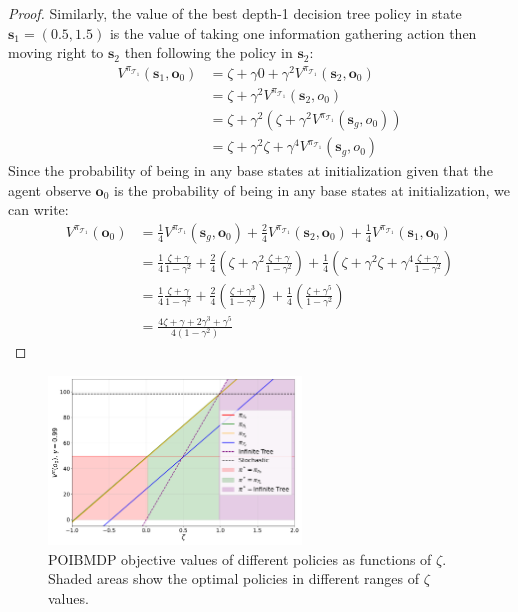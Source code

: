 \begin{proof}
Similarly, the value of the best depth-1 decision tree policy in state $\boldsymbol{s}_1=(0.5,1.5)$ is the value of taking one information gathering action then moving right to $\boldsymbol{s}_2$ then following the policy in $\boldsymbol{s}_2$:
\begin{align*}
    V^{\pi_{\mathcal{T}_1}} (\boldsymbol{s}_1, \boldsymbol{o}_0) &= \zeta + \gamma 0 + \gamma^2 V^{\pi_{\mathcal{T}_1}} (\boldsymbol{s}_2, \boldsymbol{o}_0) \\
    &= \zeta + \gamma^2 V^{\pi_{\mathcal{T}_1}} (\boldsymbol{s}_2, o_0) \\
    &= \zeta + \gamma^2 (\zeta + \gamma^2 V^{\pi_{\mathcal{T}_1}} (\boldsymbol{s}_g, o_0)) \\
    &= \zeta + \gamma^2 \zeta + \gamma^4 V^{\pi_{\mathcal{T}_1}} (\boldsymbol{s}_g, o_0)
\end{align*}
Since the probability of being in any base states at initialization given that the agent observe $\boldsymbol{o}_0$ is the probability of being in any base states at initialization, we can write:
\begin{align*}
    V^{\pi_{\mathcal{T}_1}} (\boldsymbol{o}_0) &= \frac{1}{4} V^{\pi_{\mathcal{T}_1}} (\boldsymbol{s}_g, \boldsymbol{o}_0) + \frac{2}{4} V^{\pi_{\mathcal{T}_1}} (\boldsymbol{s}_2, \boldsymbol{o}_0) + \frac{1}{4} V^{\pi_{\mathcal{T}_1}} (\boldsymbol{s}_1, \boldsymbol{o}_0) \\
    &= \frac{1}{4} \frac{\zeta + \gamma}{1 - \gamma^2} + \frac{2}{4} (\zeta + \gamma^2 \frac{\zeta + \gamma}{1 - \gamma^2}) + \frac{1}{4} (\zeta + \gamma^2 \zeta + \gamma^4 \frac{\zeta + \gamma}{1 - \gamma^2}) \\
    &= \frac{1}{4} \frac{\zeta + \gamma}{1 - \gamma^2} + \frac{2}{4} (\frac{\zeta + \gamma ^ 3}{1-\gamma^2}) + \frac{1}{4}(\frac{\zeta+\gamma^5}{1-\gamma^2}) \\
    &= \frac{4\zeta + \gamma + 2\gamma^3 + \gamma^5}{4(1-\gamma^2)}
\end{align*}
\end{proof}
\begin{figure}
    \centering
    \includegraphics[width=0.6\textwidth]{images/images_part1/objective_values_plot.pdf}
    \caption{POIBMDP objective values of different policies as functions of $\zeta$. Shaded areas show the optimal policies in different ranges of $\zeta$ values.}\label{fig:objectives}
\end{figure}

